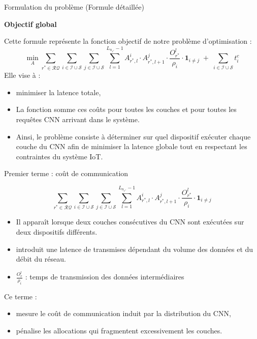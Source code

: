 \documentclass[aspectratio=169]{beamer}
\begin{document}
\begin{frame}{Formulation du problème (Formule détaillée)}

\textbf{Objectif global}

\medskip
Cette formule représente la fonction objectif de notre problème d’optimisation :
\small
\[
\min_{A}
\sum_{r^* \in \mathcal{RQ}}
\sum_{i \in \mathcal{I} \cup \mathcal{S}}
\sum_{j \in \mathcal{I} \cup \mathcal{S}}
\sum_{l=1}^{L_{n_{r^*}}-1}
A^{i}_{r^*,l} \cdot A^{j}_{r^*,l+1}
\cdot
\frac{O^{l}_{r^*}}{\rho_i}
\cdot \mathbf{1}_{i \neq j}
\;+\;
\sum_{i \in \mathcal{I} \cup \mathcal{S}} t_i^{c}
\]
\medskip
Elle vise à :
\begin{itemize}
    \item minimiser la latence totale,
    \item La fonction somme ces coûts pour toutes les couches et pour toutes les requêtes CNN arrivant dans le système.

    \item  Ainsi, le problème consiste à déterminer sur quel dispositif exécuter chaque couche du CNN afin de minimiser la latence globale tout en respectant les contraintes du système IoT.
\end{itemize}


\end{frame}

\begin{frame}{Premier terme : coût de communication}

\small
\[
\sum_{r^* \in \mathcal{RQ}}
\sum_{i \in \mathcal{I} \cup \mathcal{S}}
\sum_{j \in \mathcal{I} \cup \mathcal{S}}
\sum_{l=1}^{L_{n_{r^*}}-1}
A^{i}_{r^*,l} \cdot A^{j}_{r^*,l+1}
\cdot
\frac{O^{l}_{r^*}}{\rho_i}
\cdot \mathbf{1}_{i \neq j}
\]

\medskip
\begin{itemize}
    \item Il apparaît lorsque deux couches consécutives du CNN sont exécutées sur deux dispositifs différents.
    \item introduit une latence de transmises dépendant du volume des données et du débit du réseau.
    \item $\frac{O^l_r}{\rho_i}$ : temps de transmission des données intermédiaires
\end{itemize}

\medskip
Ce terme :
\begin{itemize}
  \item mesure le coût de communication induit par la distribution du CNN,
  \item pénalise les allocations qui fragmentent excessivement les couches.
\end{itemize}

\end{frame}
\end{document}
